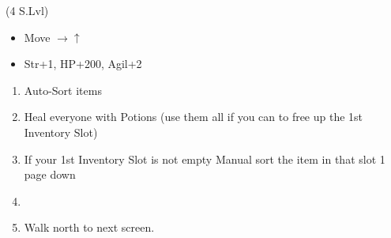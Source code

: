\begin{spheregrid}
	\begin{itemize}
		\tidusf (4 S.Lvl)
		\begin{itemize}
			\item Move $\rightarrow\uparrow$
			\item Str+1, HP+200, Agil+2
		\end{itemize}
	\end{itemize}
\end{spheregrid}
\begin{enumerate}[resume]
	\item Auto-Sort items
	\item Heal everyone with Potions (use them all if you can to free up the 1st Inventory Slot)
	\item If your 1st Inventory Slot is not empty Manual sort the item in that slot 1 page down
	\item \formation{\tidus}{\wakka}{\auron}
	\item Walk north to next screen.
\end{enumerate}